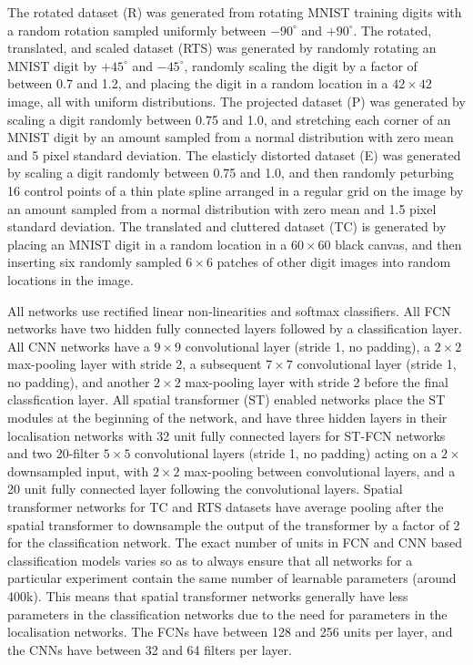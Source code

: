 \documentclass{article} %
\renewcommand{\paragraph}[1]{\par\noindent{\bf #1}}
\begin{document}
\begin{appendices}
\paragraph{Data.} The rotated dataset (R) was generated from rotating MNIST training digits with a random rotation sampled uniformly between $-90^\circ$ and $+90^\circ$. The rotated, translated, and scaled dataset (RTS) was generated by randomly rotating an MNIST digit by $+45^\circ$ and $-45^\circ$, randomly scaling the digit by a factor of between 0.7 and 1.2, and placing the digit in a random location in a $42 \times 42$ image, all with uniform distributions. The projected dataset (P) was generated by scaling a digit randomly between 0.75 and 1.0, and stretching each corner of an MNIST digit by an amount sampled from a normal distribution with zero mean and 5 pixel standard deviation. The elasticly distorted dataset (E) was generated by scaling a digit randomly between 0.75 and 1.0, and then randomly peturbing 16 control points of a thin plate spline arranged in a regular grid on the image by an amount sampled from a normal distribution with zero mean and 1.5 pixel standard deviation. The translated and cluttered dataset (TC) is generated by placing an MNIST digit in a random location in a $60\times 60$ black canvas, and then inserting six randomly sampled $6\times 6$ patches of other digit images into random locations in the image.

\paragraph{Networks.} All networks use rectified linear non-linearities and softmax classifiers. All FCN networks have two hidden fully connected layers followed by a classification layer. All CNN networks have a $9\times 9$ convolutional layer (stride 1, no padding), a $2\times 2$ max-pooling layer with stride 2, a subsequent $7 \times 7$ convolutional layer (stride 1, no padding), and another $2\times 2$ max-pooling layer with stride 2 before the final classfication layer. All spatial transformer (ST) enabled networks place the ST modules at the beginning of the network, and have three hidden layers in their localisation networks with 32 unit fully connected layers for ST-FCN networks and two 20-filter $5\times 5$ convolutional layers (stride 1, no padding) acting on a $2\times$ downsampled input, with $2 \times 2$ max-pooling between convolutional layers, and a 20 unit fully connected layer following the convolutional layers. Spatial transformer networks for TC and RTS datasets have average pooling after the spatial transformer to downsample the output of the transformer by a factor of 2 for the classification network. The exact number of units in FCN and CNN based classification models varies so as to always ensure that all networks for a particular experiment contain the same number of learnable parameters (around 400k). This means that spatial transformer networks generally have less parameters in the classification networks due to the need for parameters in the localisation networks. The FCNs have between 128 and 256 units per layer, and the CNNs have between 32 and 64 filters per layer. 


\end{appendices}
\end{document}
